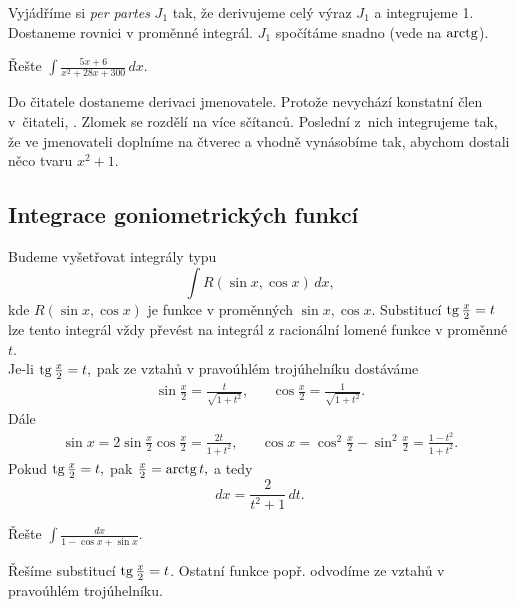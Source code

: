 \begin{reseni}
Vyjádříme si \textit{per partes} $J_1$ tak, že derivujeme celý výraz $J_1$ a integrujeme
1. Dostaneme rovnici v proměnné integrál. $J_1$ spočítáme snadno (vede na $\operatorname{arctg}$).
\end{reseni}

\begin{priklad}
Řešte $\int \frac{5x+6}{x^2+28x+300}\, dx.$
\end{priklad}

\begin{reseni}
Do čitatele dostaneme derivaci jmenovatele. Protože nevychází konstatní člen
v~čitateli, . Zlomek se rozdělí na více sčítanců.
Poslední z~nich integrujeme tak, že ve jmenovateli doplníme na čtverec a vhodně vynásobíme
tak, abychom dostali něco tvaru $x^2+1$.
\end{reseni}


\subsection*{Integrace goniometrických funkcí}
\begin{pozn}
    Budeme vyšetřovat integrály typu
    $$\int R(\sin x, \cos x) \, dx,$$
    kde $R(\sin x, \cos x)$ je funkce v proměnných $\sin x, \cos x.$ Substitucí
    $\operatorname{tg} \frac{x}{2}=t$ lze tento integrál vždy převést na integrál z racionální
    lomené funkce v proměnné $t$. \\
    Je-li $\operatorname{tg} \frac{x}{2}=t,$ pak ze vztahů v pravoúhlém trojúhelníku dostáváme
    \begin{align*}
        \sin \frac{x}{2}=\frac{t}{\sqrt{1+t^2} }, & & \cos \frac{x}{2}=\frac{1}{\sqrt{1+t^2} }.
    \end{align*}
    Dále
    \begin{align*}
        \sin x = 2\sin \frac{x}{2}\cos \frac{x}{2}=\frac{2t}{1+t^2}, & &
        \cos x = \cos^2 \frac{x}{2}-\sin^2 \frac{x}{2}=\frac{1-t^2}{1+t^2}.
    \end{align*}
    Pokud $\operatorname{tg} \frac{x}{2}=t,$ pak $\frac{x}{2}=\operatorname{arctg} t,$ a tedy
    $$dx = \frac{2}{t^2+1}\, dt.$$
\end{pozn}

\begin{priklad}
Řešte $\int \frac{dx}{1-\cos x+\sin x}$.
\end{priklad}

\begin{reseni}
Řešíme substitucí $\operatorname{tg} \frac{x}{2}=t$. Ostatní funkce popř. odvodíme ze vztahů
v pravoúhlém trojúhelníku.
\end{reseni}

